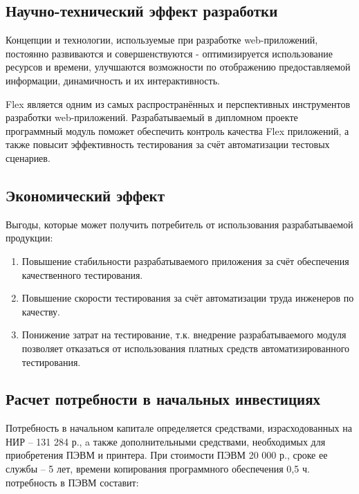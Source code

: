 \subsection{Научно-технический эффект разработки}

Концепции и технологии, используемые при разработке web-приложений,
постоянно развиваются и совершенствуются - оптимизируется использование ресурсов и времени,
улучшаются возможности по отображению предоставляемой информации, динамичность и их интерактивность.

Flex является одним из самых распространённых и перспективных инструментов разработки web-приложений.
Разрабатываемый в дипломном проекте программный модуль поможет обеспечить контроль качества Flex
приложений, а также повысит эффективность тестирования за счёт автоматизации тестовых сценариев.

\subsection{Экономический эффект}

Выгоды, которые может получить потребитель от использования разрабатываемой продукции:

\begin{enumerate}
\item Повышение стабильности разрабатываемого приложения за счёт обеспечения качественного тестирования.
\item Повышение скорости тестирования за счёт автоматизации труда инженеров по качеству.
\item Понижение затрат на тестирование, т.к. внедрение разрабатываемого модуля позволяет отказаться от
использования платных средств автоматизированного тестирования.
\end{enumerate}

\subsection{Расчет потребности в начальных инвестициях}

Потребность в начальном капитале определяется средствами, израсходованных на НИР – 131 284 р.,
a также дополнительными средствами, необходимых для приобретения ПЭВМ и принтера. При стоимости ПЭВМ 20 000 р.,
сроке ее службы – 5 лет, времени копирования программного обеспечения 0,5 ч. потребность в ПЭВМ составит: